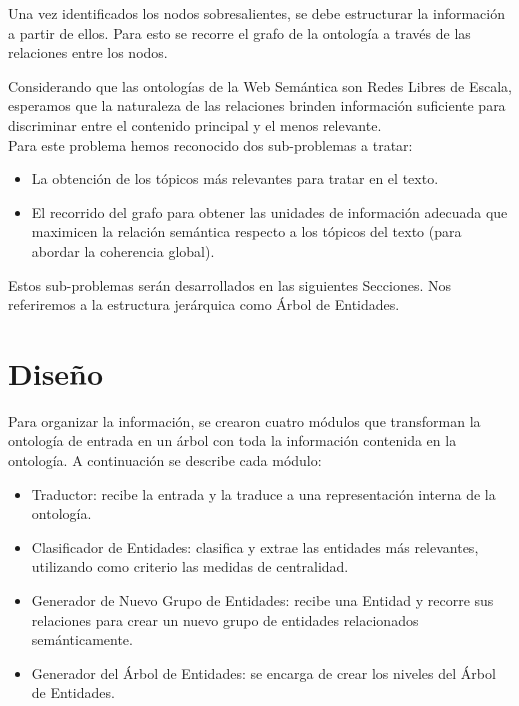 Una vez identificados los nodos sobresalientes, se debe estructurar la información a partir de ellos. Para esto se recorre el grafo de la ontología a través de las relaciones entre los nodos.

Considerando que las ontologías de la Web Semántica son Redes Libres de Escala, esperamos que la naturaleza de las relaciones brinden información suficiente para discriminar entre el contenido principal y el menos relevante.
\\

Para este problema hemos reconocido dos sub-problemas a tratar:

\begin{itemize}
    \item La obtención de los tópicos más relevantes para tratar en el texto.%
    \item El recorrido del grafo para obtener las unidades de información adecuada que maximicen la relación semántica respecto a los tópicos del texto (para abordar la coherencia global).%
\end{itemize}

Estos sub-problemas serán desarrollados en las siguientes Secciones.  Nos referiremos a la estructura jerárquica como Árbol de Entidades.


\section{Diseño}
Para organizar la información, se crearon cuatro módulos que transforman la ontología de entrada en un árbol con toda la información contenida en la ontología. A continuación se describe cada módulo:
\begin{itemize}
    \item Traductor: recibe la entrada y la traduce a una representación interna de la ontología.
    \item Clasificador de Entidades: clasifica y extrae las entidades más relevantes, utilizando como criterio las medidas de centralidad.
    \item Generador de Nuevo Grupo de Entidades: recibe una Entidad y recorre sus relaciones para crear un nuevo grupo de entidades relacionados semánticamente.
    \item Generador del Árbol de Entidades: se encarga de crear los niveles del Árbol de Entidades. 
\end{itemize}

